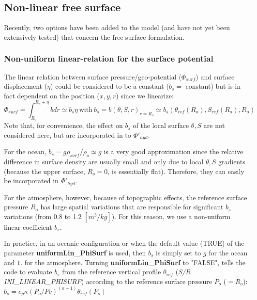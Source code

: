 


\subsection{Non-linear free surface}
\label{sect:nonlinear-freesurface}

Recently, two options have been added to the model (and have not yet
been extensively tested) that concern the free surface formulation.


\subsubsection{Non-uniform linear-relation for the surface potential}

The linear relation between surface pressure/geo-potential
($\Phi_{surf}$) and surface displacement ($\eta$) could be considered
to be a constant ($b_s=$ constant)
but is in fact dependent on the position ($x,y,r$)
since we linearize:
$$\Phi_{surf}=\int_{R_o}^{R_o+\eta} b dr \simeq b_s \eta
~\mathrm{with}~ b_s = b(\theta,S,r)_{r=R_o} 
\simeq b_s(\theta_{ref}(R_o),S_{ref}(R_o),R_o)$$
Note that, for convenience, the effect on $b_s$ of the local surface
$\theta,S$ are not considered here, but are incorporated in to
$\Phi'_{hyd}$.

For the ocean, $b_s = g \rho_{surf} / \rho_o \simeq g$ is a very good
approximation since the relative difference in surface density are
usually small and only due to local $\theta,S$ gradients (because the
upper surface, $R_o = 0$, is essentially flat). Therefore, they can
easily be incorporated in $\Phi'_{hyd}$.

For the atmosphere, however, because of topographic effects, the
reference surface pressure $R_o$ has large spatial variations that
are responsible for significant $b_s$ variations (from 0.8 to 1.2
$[m^3/kg]$). For this reason, we use a non-uniform linear coefficient
$b_s$.

In practice, in an oceanic configuration or when the default value
(TRUE) of the parameter {\bf uniformLin\_PhiSurf} is used, then $b_s$
is simply set to $g$ for the ocean and $1.$ for the atmosphere.
Turning {\bf uniformLin\_PhiSurf} to "FALSE", tells the code to
evaluate $b_s$ from the reference vertical profile $\theta_{ref}$
({\it S/R INI\_LINEAR\_PHISURF}) according to the reference surface
pressure $P_o$ ($=R_o$): $b_s = c_p \kappa (P_o / Pc)^{(\kappa - 1)}
\theta_{ref}(P_o)$


